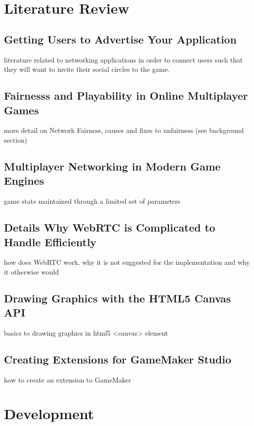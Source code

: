 \documentclass[bsc,frontabs,twoside,singlespacing,parskip,deptreport]{infthesis}     %
\begin{document}
\chapter{Literature Review}

\section{Getting Users to Advertise Your Application}
literature related to networking applications in order to connect users such that they will want to invite their social circles to the game.

\section{Fairnesss and Playability in Online Multiplayer Games}
more detail on Network Fairness, causes and fixes to unfairness (see background section)

\section{Multiplayer Networking in Modern Game Engines}
game state maintained through a limited set of parameters

\section{Details Why WebRTC is Complicated to Handle Efficiently}
how does WebRTC work, why it is not suggested for the implementation and why it otherwise would

\section{Drawing Graphics with the HTML5 Canvas API}
basics to drawing graphics in html5 <canvas> element

\section{Creating Extensions for GameMaker Studio}
how to create an extension to GameMaker



\chapter{Development}
\end{document}
